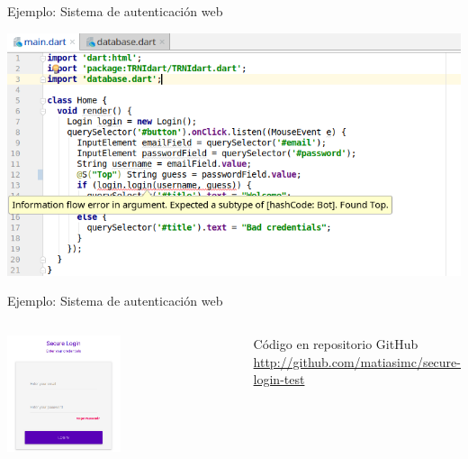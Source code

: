 \documentclass[aspectratio=169,18pt]{beamer}
\begin{document}
\begin{frame}[fragile]{Ejemplo: Sistema de autenticación web}
	\begin{center}
		\includegraphics[width=1.0\textwidth]{images/html3.png}
	\end{center}
\end{frame}
%


\begin{frame}[fragile]{Ejemplo: Sistema de autenticación web}
	\begin{columns}[T,onlytextwidth]
		\begin{center}
			\includegraphics[width=0.5\textwidth]{images/screen4.png}
		\end{center}
		\vspace{2cm}
		Código en repositorio GitHub~\cite{repotest} \\ \url{http://github.com/matiasimc/secure-login-test}
	\end{columns}

\end{frame}
\end{document}
